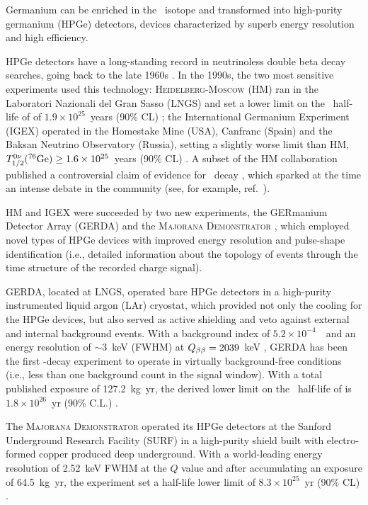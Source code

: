 %
Germanium can be enriched in the \bb\ isotope and transformed into high-purity germanium (HPGe) detectors, devices characterized by superb energy resolution and high efficiency. 

HPGe detectors have a long-standing record in neutrinoless double beta decay searches, going back to the late 1960s \cite{Fiorini:1967in,Fiorini:1970}. In the 1990s, the two most sensitive experiments used this technology: \textsc{Heidelberg-Moscow} (HM) ran in the Laboratori Nazionali del Gran Sasso (LNGS) and set a lower limit on the \bbonu\ half-life of  of $1.9 \times 10^{25}$~years (90\% CL) \cite{Klapdor-Kleingrothaus:2000eir}; the International Germanium Experiment (IGEX) operated in the Homestake Mine (USA), Canfranc (Spain) and the Baksan Neutrino Observatory (Russia), setting a slightly worse limit than HM, $T^{0\nu}_{1/2}(^{76}\mathrm{Ge}) \geq 1.6 \times 10^{25}$~years (90\% CL) \cite{IGEX:2002bce}. A subset of the HM collaboration published a controversial claim of evidence for \bbonu\ decay \cite{Klapdor-Kleingrothaus:2001oba, Klapdor-Kleingrothaus:2006zcr}, which sparked at the time an intense debate in the community (see, for example, ref.~\cite{Aalseth:2002dt}). 

HM and IGEX were succeeded by two new experiments, the GERmanium Detector Array (GERDA) \cite{GERDA:2020xhi} and the \textsc{Majorana Demonstrator} \cite{Majorana:2022udl}, which employed novel types of HPGe devices with improved energy resolution and pulse-shape identification (i.e., detailed information about the topology of events through the time structure of the recorded charge signal).

GERDA, located at LNGS, operated bare HPGe detectors in a high-purity instrumented liquid argon (LAr) cryostat, which provided not only the cooling for the HPGe devices, but also served as active shielding and veto against external and internal background events. With a background index of $5.2\times10^{-4}$~\ckky\ and an energy resolution of $\sim3$~keV (FWHM) at $Q_{\beta\beta}=2039$~keV \cite{GERDA:2020xhi}, GERDA has been the first \bbonu-decay experiment to operate in virtually background-free conditions (i.e., less than one background count in the signal window). With a total published exposure of 127.2~kg~yr, the derived lower limit on the \bbonu\ half-life of  is $1.8\times10^{26}$~yr (90\% C.L.) \cite{GERDA:2020xhi}. 

The \textsc{Majorana Demonstrator} operated its HPGe detectors at the Sanford Underground Research Facility (SURF) in a high-purity shield built with electro-formed copper produced deep underground. With a world-leading energy resolution of 2.52~keV FWHM at the $Q$ value and after accumulating an exposure of 64.5~kg~yr, the experiment set a half-life lower limit of $8.3\times10^{25}$~yr (90\% CL) \cite{Majorana:2022udl}.

